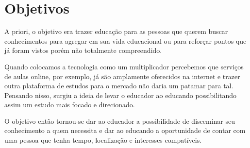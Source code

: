 \chapter[Objetivos]{Objetivos}

A priori, o objetivo era trazer educação para as pessoas que querem buscar conhecimentos para agregar em sua vida educacional ou para reforçar pontos que já foram vistos porém não totalmente compreendido. 


Quando colocamos a tecnologia como um multiplicador percebemos que serviços de aulas online, por exemplo, já são amplamente oferecidos na internet e trazer outra plataforma de estudos para o mercado não daria um patamar para tal. Pensando nisso, surgiu a ideia de levar o educador ao educando possibilitando assim um estudo mais focado e direcionado.

O objetivo então tornou-se dar ao educador a possibilidade de disceminar seu conhecimento a quem necessita e dar ao educando a oportunidade de contar com uma pessoa que tenha tempo, localização e interesses compatíveis.

